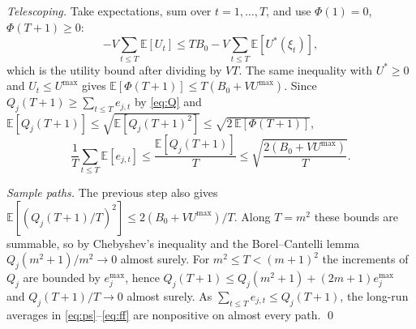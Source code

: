 \documentclass[preprint,11pt]{elsarticle}
\theoremstyle{definition}
\theoremstyle{remark}
\newcommand{\E}{\mathbb{E}}
\begin{document}
\emph{Telescoping.}
Take expectations, sum over $t=1,\dots,T$, and use $\Phi(1)=0$, $\Phi(T+1)\ge0$:
\[
-V\sum_{t\le T}\E[U_t]\le TB_0-V\sum_{t\le T}\E[U^*(\xi_t)],
\]
which is the utility bound after dividing by $VT$.
The same inequality with $U^*\ge0$ and $U_t\le U^{\max}$ gives $\E[\Phi(T+1)]\le T(B_0+VU^{\max})$.
Since $Q_j(T+1)\ge\sum_{t\le T}e_{j,t}$ by \eqref{eq:Q} and $\E[Q_j(T+1)]\le\sqrt{\E[Q_j(T+1)^2]}\le\sqrt{2\,\E[\Phi(T+1)]}$,
\[
\frac1T\sum_{t\le T}\E[e_{j,t}]\le\frac{\E[Q_j(T+1)]}{T}\le\sqrt{\frac{2(B_0+VU^{\max})}{T}} .
\]

\emph{Sample paths.}
The previous step also gives $\E[(Q_j(T+1)/T)^2]\le2(B_0+VU^{\max})/T$.
Along $T=m^2$ these bounds are summable, so by Chebyshev's inequality and the Borel--Cantelli lemma $Q_j(m^2+1)/m^2\to0$ almost surely.
For $m^2\le T<(m+1)^2$ the increments of $Q_j$ are bounded by $e_j^{\max}$, hence $Q_j(T+1)\le Q_j(m^2+1)+(2m+1)e_j^{\max}$ and $Q_j(T+1)/T\to0$ almost surely.
As $\sum_{t\le T}e_{j,t}\le Q_j(T+1)$, the long-run averages in \eqref{eq:ps}--\eqref{eq:ff} are nonpositive on almost every path. \qed
\end{document}
